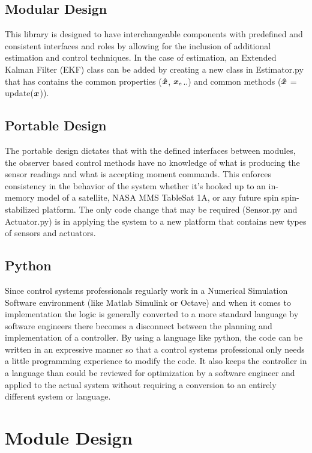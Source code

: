 \subsection{Modular Design}

This library is designed to have interchangeable components with predefined and consistent interfaces and roles by allowing for the inclusion of additional estimation and control techniques. In the case of estimation, an Extended Kalman Filter (EKF) class can be added by creating a new class in Estimator.py that has contains the common properties ($\boldsymbol{\hat{x}}$, $\boldsymbol{x}_e$..) and common methods ($\boldsymbol{\hat{x}}$ = update($\boldsymbol{x}$)).

\subsection{Portable Design}

The portable design dictates that with the defined interfaces between modules, the observer based control methods have no knowledge of what is producing the sensor readings and what is accepting moment commands. This enforces consistency in the behavior of the system whether it's hooked up to an in-memory model of a satellite, NASA MMS TableSat 1A, or any future spin spin-stabilized platform. The only code change that may be required (Sensor.py and Actuator.py) is in applying the system to a new platform that contains new types of sensors and actuators.

\subsection{Python}

Since control systems professionals regularly work in a Numerical Simulation Software environment (like Matlab Simulink or Octave) and when it comes to implementation the logic is generally converted to a more standard language by software engineers there becomes a disconnect between the planning and implementation of a controller. By using a language like python, the code can be written in an expressive manner so that a control systems professional only needs a little programming experience to modify the code. It also keeps the controller in a language than could be reviewed for optimization by a software engineer and applied to the actual system without requiring a conversion to an entirely different system or language.




\section{Module Design}
\label{sec:Module Design}

